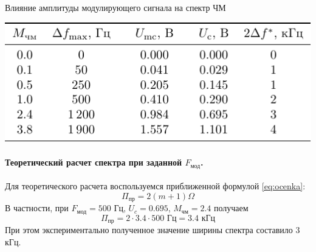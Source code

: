 \documentclass[a4paper,12pt]{article}
\begin{document}

\begin{table}[H]
	\caption{Влияние амплитуды модулирующего сигнала на спектр ЧМ}
	\vspace{1em}
	\label{tab:M}
	\centering
	\includegraphics[scale=1.2]{plot/tab3.pdf}
\end{table}

\paragraph{Теоретический расчет спектра при заданной $F_\text{мод}$.} Для теоретического расчета воспользуемся приближенной формулой \eqref{eq:ocenka}:
\begin{equation}
	\Pi_\text{пр}=2(m+1)\Omega
\end{equation}
В частности, при $F_{\text{мод}}=500\text{ Гц}$, $U_c=0.695$, $M_{\text{чм}}=2.4$  получаем
\begin{equation}
	\Pi_\text{пр}=2\cdot3.4\cdot500 \text{ Гц}=3.4 \text{ кГц}
\end{equation}
При этом экспериментально полученное значение ширины спектра составило 3 кГц.
\end{document}
